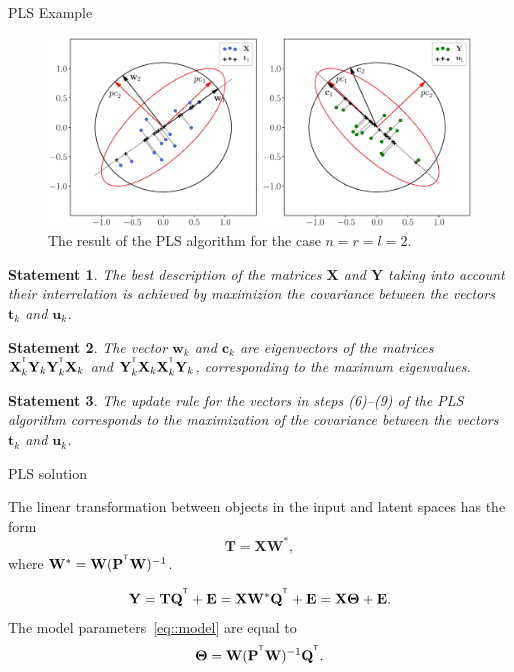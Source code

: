 \documentclass{beamer}
\newcommand{\bw}{\mathbf{w}}
\newcommand{\bY}{\mathbf{Y}}
\newcommand{\bX}{\mathbf{X}}
\newcommand{\bu}{\mathbf{u}}
\newcommand{\bt}{\mathbf{t}}
\newcommand{\bc}{\mathbf{c}}
\newcommand{\bP}{\mathbf{P}}
\newcommand{\bT}{\mathbf{T}}
\newcommand{\bQ}{\mathbf{Q}}
\newcommand{\bE}{\mathbf{E}}
\newcommand{\bW}{\mathbf{W}}
\newcommand{\bTheta}{\boldsymbol{\Theta}}
\newcommand{\T}{^{\text{\tiny\sffamily\upshape\mdseries T}}}
\newtheorem{statement}{Statement}
\begin{document}
\begin{frame}{PLS Example}
\begin{figure}
	\includegraphics[width=\linewidth]{figs/PLSFigure.eps}
	\caption{The result of the PLS algorithm for the case $n = r = l = 2$.}
\end{figure}
\end{frame}
\begin{frame}
	\begin{statement}
		The best description of the matrices $\bX$ and $\bY$ taking into account their interrelation is achieved by maximizion the covariance between the vectors $\bt_k$ and $\bu_k$.
	\end{statement}
	\vfill
	\begin{statement}
		The vector $\bw_k$ and $\bc_k$ are eigenvectors of the matrices $\bX_k^{\T} \bY_k \bY_k^{\T} \bX_k$ and $\bY_k^{\T} \bX_k \bX_k^{\T} \bY_k$, corresponding to the maximum eigenvalues.
	\end{statement}
	\vfill
	\begin{statement}
		The update rule for the vectors in steps (6)--(9) of the PLS algorithm corresponds to the maximization of the covariance between the vectors $\bt_k$ and $\bu_k$.
	\end{statement}
	
\end{frame}
\begin{frame}{PLS solution}

	The linear transformation between objects in the input and latent spaces has the form
	\begin{equation*}
	\bT = \bX \bW^*,
	\label{eq::W*}
	\end{equation*}
	where $\bW^* = \bW (\bP^{\T} \bW)^{-1}$.

	\begin{equation*}
	\bY = \bT \bQ^{\T} + \bE = \bX \bW^* \bQ^{\T} + \bE = \bX \bTheta + \bE.
	\end{equation*}
	The model parameters~\eqref{eq::model} are equal to
	\begin{equation*}
	\bTheta = \bW (\bP^{\T} \bW)^{-1} \bQ^{\T}.
	\label{eq::model_parameters}
	\end{equation*}
	
\end{frame}
\end{document}
